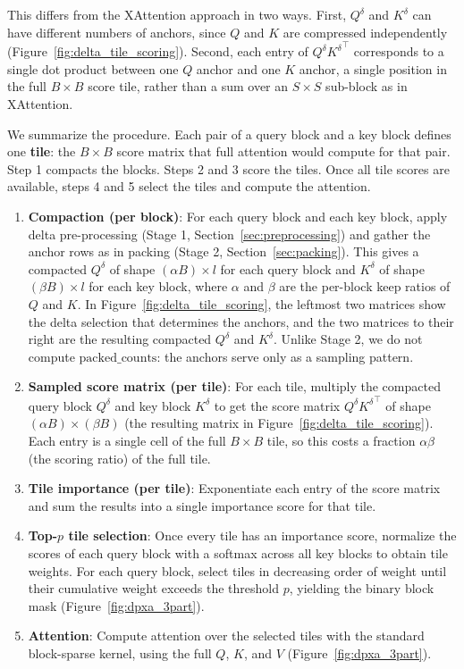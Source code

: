 This differs from the XAttention approach in two ways. First, $Q^\delta$ and $K^\delta$ can have different numbers of anchors, since $Q$ and $K$ are compressed independently (Figure~\ref{fig:delta_tile_scoring}). Second, each entry of $Q^\delta {K^\delta}^\top$ corresponds to a single dot product between one $Q$ anchor and one $K$ anchor, a single position in the full $B \times B$ score tile, rather than a sum over an $S \times S$ sub-block as in XAttention.

We summarize the procedure. Each pair of a query block and a key block defines one \textbf{tile}: the $B \times B$ score matrix that full attention would compute for that pair. Step 1 compacts the blocks. Steps 2 and 3 score the tiles. Once all tile scores are available, steps 4 and 5 select the tiles and compute the attention.

\begin{enumerate}
    \item \textbf{Compaction (per block)}: For each query block and each key block, apply delta pre-processing (Stage 1, Section~\ref{sec:preprocessing}) and gather the anchor rows as in packing (Stage 2, Section~\ref{sec:packing}). This gives a compacted $Q^\delta$ of shape $(\alpha B) \times l$ for each query block and $K^\delta$ of shape $(\beta B) \times l$ for each key block, where $\alpha$ and $\beta$ are the per-block keep ratios of $Q$ and $K$. In Figure~\ref{fig:delta_tile_scoring}, the leftmost two matrices show the delta selection that determines the anchors, and the two matrices to their right are the resulting compacted $Q^\delta$ and $K^\delta$. Unlike Stage 2, we do not compute $\text{packed\_counts}$: the anchors serve only as a sampling pattern.

    \item \textbf{Sampled score matrix (per tile)}: For each tile, multiply the compacted query block $Q^\delta$ and key block $K^\delta$ to get the score matrix $Q^\delta {K^\delta}^\top$ of shape $(\alpha B) \times (\beta B)$ (the resulting matrix in Figure~\ref{fig:delta_tile_scoring}). Each entry is a single cell of the full $B \times B$ tile, so this costs a fraction $\alpha \beta$ (the scoring ratio) of the full tile.

    \item \textbf{Tile importance (per tile)}: Exponentiate each entry of the score matrix and sum the results into a single importance score for that tile.

    \item \textbf{Top-$p$ tile selection}: Once every tile has an importance score, normalize the scores of each query block with a softmax across all key blocks to obtain tile weights. For each query block, select tiles in decreasing order of weight until their cumulative weight exceeds the threshold $p$, yielding the binary block mask (Figure~\ref{fig:dpxa_3part}).

    \item \textbf{Attention}: Compute attention over the selected tiles with the standard block-sparse kernel, using the full $Q$, $K$, and $V$ (Figure~\ref{fig:dpxa_3part}).
\end{enumerate}

